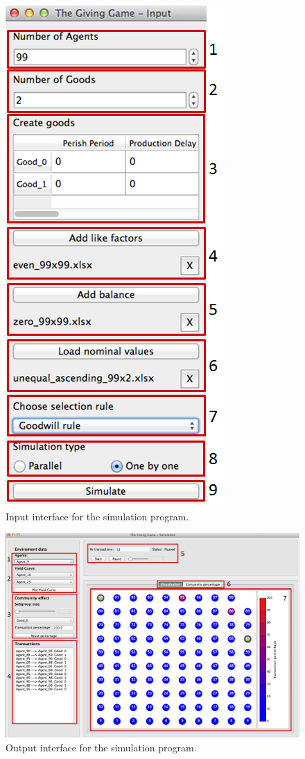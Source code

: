 \documentclass[twoside,openright]{uva-bachelor-thesis}
\begin{document}
\begin{figure}[h]
\centering
\includegraphics[scale=0.5]{Manual/Input}
\caption{Input interface for the simulation program.}
\end{figure}
\begin{figure}[h]
\centering
\includegraphics[scale=0.5]{Manual/Output}
\caption{Output interface for the simulation program.}
\end{figure}
\end{document}
